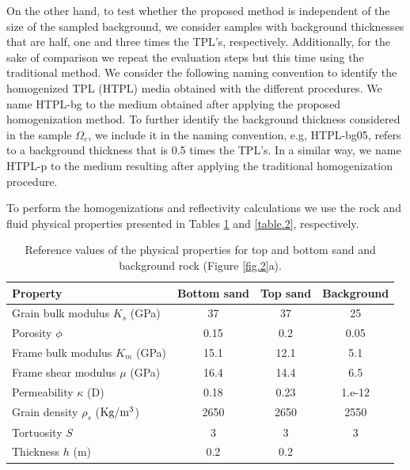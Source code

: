\documentclass[draft]{agujournal2019}
\begin{document}

On the other hand,  to test whether the proposed method is independent of the size of the sampled background, we consider samples with background thicknesses that are half, one and three times the TPL's, respectively. Additionally, for the sake of comparison we repeat the evaluation steps  but this time using the traditional method. 
We consider the following naming convention to identify the homogenized TPL (HTPL) media obtained with the different procedures. We name HTPL-bg to the medium obtained after applying the proposed homogenization method. To further identify the background thickness considered in the sample $\Omega_e$, we include it in the naming convention, e.g, HTPL-bg05, refers to a background thickness that is 0.5 times the TPL's. In a similar way, we name HTPL-p to the medium resulting after applying the traditional homogenization procedure.

To perform the homogenizations and reflectivity calculations we use the rock and fluid physical properties presented in Tables \ref{table.1} and \ref{table.2}, respectively.

\begin{table}[!ht]
  \caption{Reference values of the physical properties for top and bottom sand and background rock (Figure \ref{fig.2}a). }
\begin{center}
  \begin{tabular}{ | l  c  c c | }
    \hline
    Property & Bottom sand & Top sand & Background  \\ \hline
    Grain bulk modulus $K_s$ (\rm{GPa}) & 37 & 37 & 25 \\ 
    Porosity $\phi$ & 0.15 & 0.2 & 0.05  \\ 
    Frame bulk modulus $K_m$ (GPa) & 15.1  & 12.1 & 5.1\\ 
    Frame shear modulus $\mu$ (GPa) & 16.4  & 14.4 & 6.5 \\
    Permeability $\kappa$ (D) & 0.18 & 0.23 & 1.e-12 \\
    Grain density $\rho_s$ ($\rm{Kg/m^3}$) &2650 & 2650 & 2550\\ 
    Tortuosity $S$ & 3 & 3 & 3\\
    Thickness $h$ (m) & 0.2 & 0.2 &  \\ 
                                       
    \hline
  \end{tabular}
  \label{table.1}
\end{center}
\end{table}
\end{document}
